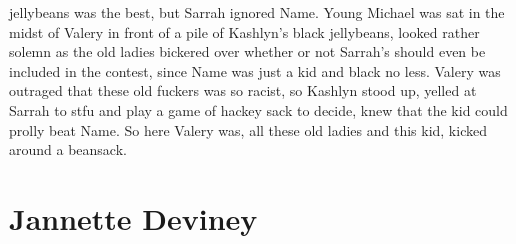 \documentclass[12pt]{book}
\begin{document}
jellybeans was the best, but Sarrah ignored Name. Young Michael was sat in the midst of Valery in front of a pile of Kashlyn's black jellybeans, looked rather solemn as the old ladies bickered over whether or not Sarrah's should even be included in the contest, since Name was just a kid and black no less. Valery was outraged that these old fuckers was so racist, so Kashlyn stood up, yelled at Sarrah to stfu and play a game of hackey sack to decide, knew that the kid could prolly beat Name. So here Valery was, all these old ladies and this kid, kicked around a beansack.



\chapter{Jannette Deviney}
\end{document}
